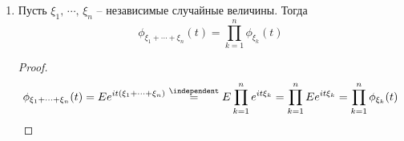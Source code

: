 \begin{enumerate}
	      \[\forall t:\: \phi(t) \in \mathbb{R} \Leftrightarrow \xi \stackrel{d}{=} -\xi\]
	      то есть распределение $\xi$ симметрично:
	      \[\forall B \in \mathcal{B}(\mathbb{R}^n) :\: P(\xi \in B) = P(\xi \in -B)\]
	      \begin{proof}
		      $\Rightarrow$:
		      \[\phi_{-\xi}(t) = \phi_\xi(-t) = \overline{\phi_\xi(t)} = \phi_\xi(t)\Rightarrow \xi \stackrel{d}{=} - \xi\]
		      $\Leftarrow$:
		      \[\phi_\xi(t) = \phi_{-\xi}(t) = \phi_\xi(-t) = \overline{\phi_\xi(t)} \Rightarrow \forall t:\: \phi_\xi(t) \in \mathbb{R}\]
	      \end{proof}
	\item Пусть $\xi_1,\,\cdots,\,\xi_n$ -- независимые случайные величины. Тогда
	      \[\phi_{\xi_1 + \cdots + \xi_n}(t) = \prod_{k = 1}^n \phi_{\xi_k}(t)\]
	      \begin{proof}
          \[\phi_{\xi_1 + \cdots + \xi_n}(t) = Ee^{it(\xi_1 + \cdots + \xi_n)} \stackrel{\independent}{=} E\prod_{k = 1}^n e^{it\xi_k} = \prod_{k = 1}^n Ee^{it\xi_k} = \prod_{k = 1}^n \phi_{\xi_k}(t)\]
	      \end{proof}
\end{enumerate}
